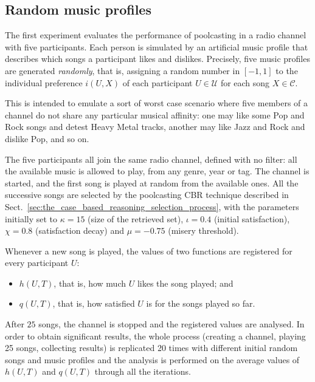 
\subsection{Random music profiles} %
\label{sub:initial_configuration}


The first experiment evaluates the performance of poolcasting in a radio channel with five participants.
Each person is simulated by an artificial music profile that describes which songs a participant likes and dislikes.
Precisely, five music profiles are generated \emph{randomly}, that is, assigning a random number in $[-1,1]$ to the individual preference $i(U,X)$ of each participant $U \in \mathcal{U}$ for each song $X \in \mathcal{C}$.

This is intended to emulate a sort of worst case scenario where five members of a channel do not share any particular musical affinity: one may like some Pop and Rock songs and detest Heavy Metal tracks, another may like Jazz and Rock and dislike Pop, and so on.

The five participants all join the same radio channel, defined with no filter: all the available music is allowed to play, from any genre, year or tag.
The channel is started, and the first song is played at random from the available ones.
%
All the successive songs are selected by the poolcasting CBR technique described in Sect.~\ref{sec:the_case_based_reasoning_selection_process}, with the parameters initially set to $\kappa = 15$ (size of the retrieved set), $\iota = 0.4$ (initial satisfaction), $\chi = 0.8$ (satisfaction decay) and $\mu = -0.75$ (misery threshold).

Whenever a new song is played, the values of two functions are registered for every participant $U$:
\begin{itemize}
 \item $h(U,T)$, that is, how much $U$ likes the song played; and
 \item $q(U,T)$, that is, how satisfied $U$ is for the songs played so far.
\end{itemize}

After $25$ songs, the channel is stopped and the registered values are analysed.
In order to obtain significant results, the whole process (creating a channel, playing 25 songs, collecting results) is replicated 20 times with different initial random songs and music profiles and the analysis is performed on the average values of $h(U,T)$ and $q(U,T)$ through all the iterations.


